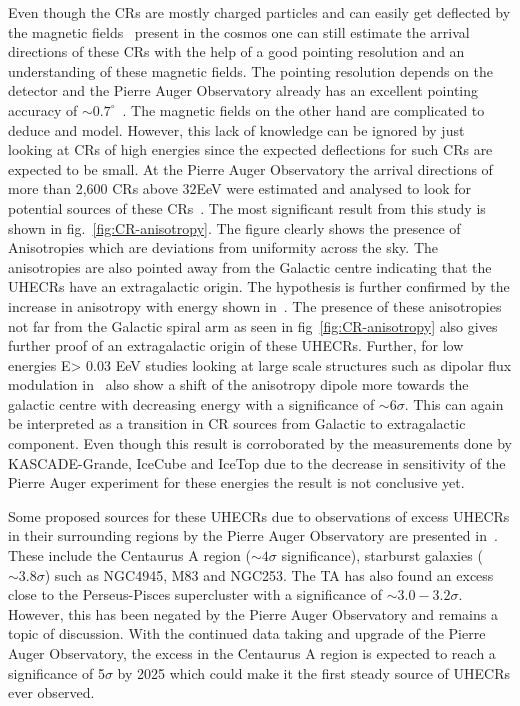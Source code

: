 Even though the \glspl{CR} are mostly charged particles and can easily get deflected by the magnetic fields~\cite{Ar_mburo_Garc_a_2021} present in the cosmos one can still estimate the arrival directions of these \glspl{CR} with the help of a good pointing resolution and an understanding of these magnetic fields. The pointing resolution depends on the detector and the Pierre Auger Observatory already has an excellent pointing accuracy of $\sim 0.7^{\circ}$~\cite{BONIFAZI200920}. The magnetic fields on the other hand are complicated to deduce and model. However, this lack of knowledge can be ignored by just looking at \glspl{CR} of high energies since the expected deflections for such \glspl{CR} are expected to be small. At the Pierre Auger Observatory the arrival directions of more than 2,600 \glspl{CR} above 32EeV were estimated and analysed to look for potential sources of these \glspl{CR}~\cite{Abreu_2022}. The most significant result from this study is shown in fig.~\ref{fig:CR-anisotropy}. The figure clearly shows the presence of Anisotropies which are deviations from uniformity across the sky. The anisotropies are also pointed away from the Galactic centre indicating that the \glspl{UHECR} have an extragalactic origin. The hypothesis is further confirmed by the increase in anisotropy with energy shown in~\cite{Abreu_2022}. The presence of these anisotropies not far from the Galactic spiral arm as seen in fig~\ref{fig:CR-anisotropy} also gives further proof of an extragalactic origin of these \glspl{UHECR}. Further, for low energies E> 0.03 EeV studies looking at large scale structures such as dipolar flux modulation in~\cite{Aab_2020_dipole_modulation} also show a shift of the anisotropy dipole more towards the galactic centre with decreasing energy with a significance of $\sim 6 \sigma$. This can again be interpreted as a transition in CR sources from Galactic to extragalactic component. Even though this result is corroborated by the measurements done by KASCADE-Grande, IceCube and IceTop due to the decrease in sensitivity of the Pierre Auger experiment for these energies the result is not conclusive yet.

Some proposed sources for these \glspl{UHECR} due to observations of excess \glspl{UHECR} in their surrounding regions by the Pierre Auger Observatory are presented in~\cite{TelescopeArray:2021gxg}. These include the Centaurus A region ($\sim 4\sigma$ significance), starburst galaxies ($\sim 3.8\sigma$) such as NGC4945, M83 and NGC253. The \gls{TA} has also found an excess close to the Perseus-Pisces supercluster with a significance of $\sim3.0-3.2\sigma$. However, this has been negated by the Pierre Auger Observatory and remains a topic of discussion. With the continued data taking and upgrade of the Pierre Auger Observatory, the excess in the Centaurus A region is expected to reach a significance of 5$\sigma$  by 2025 which could make it the first steady source of \glspl{UHECR} ever observed. 
 

